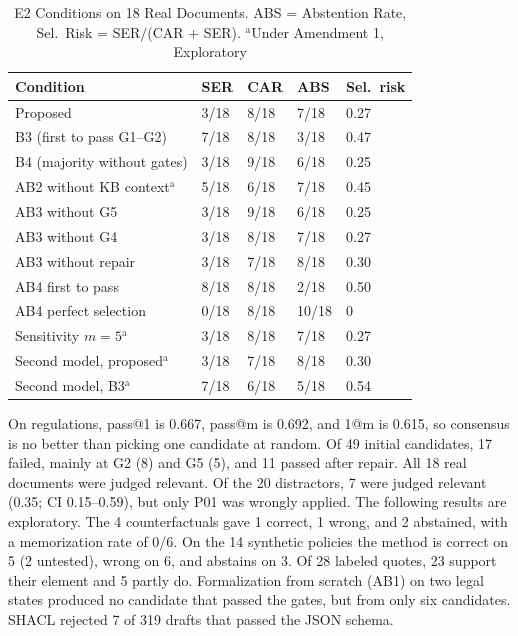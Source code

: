 \documentclass[conference]{IEEEtran}
\begin{document}
\begin{table}[t]
\centering
\caption{E2 Conditions on 18 Real Documents. ABS = Abstention Rate, Sel.\ Risk = SER$/$(CAR $+$ SER). $^{\mathrm{a}}$Under Amendment 1, Exploratory}
\label{tab:e2}
\scriptsize
\setlength{\tabcolsep}{3pt}
\begin{tabularx}{\columnwidth}{@{}L P{0.75cm} P{0.75cm} P{0.75cm} P{1.1cm}@{}}
\toprule
\textbf{Condition} & \textbf{SER} & \textbf{CAR} & \textbf{ABS} & \textbf{Sel.\ risk} \\
\midrule
Proposed & 3/18 & 8/18 & 7/18 & 0.27 \\
B3 (first to pass G1--G2) & 7/18 & 8/18 & 3/18 & 0.47 \\
B4 (majority without gates) & 3/18 & 9/18 & 6/18 & 0.25 \\
AB2 without KB context$^{\mathrm{a}}$ & 5/18 & 6/18 & 7/18 & 0.45 \\
AB3 without G5 & 3/18 & 9/18 & 6/18 & 0.25 \\
AB3 without G4 & 3/18 & 8/18 & 7/18 & 0.27 \\
AB3 without repair & 3/18 & 7/18 & 8/18 & 0.30 \\
AB4 first to pass & 8/18 & 8/18 & 2/18 & 0.50 \\
AB4 perfect selection & 0/18 & 8/18 & 10/18 & 0 \\
Sensitivity $m = 5$$^{\mathrm{a}}$ & 3/18 & 8/18 & 7/18 & 0.27 \\
Second model, proposed$^{\mathrm{a}}$ & 3/18 & 7/18 & 8/18 & 0.30 \\
Second model, B3$^{\mathrm{a}}$ & 7/18 & 6/18 & 5/18 & 0.54 \\
\bottomrule
\end{tabularx}
\end{table}

On regulations, pass@1 is 0.667, pass@m is 0.692, and 1@m is 0.615, so consensus is no better than picking one candidate at random. Of 49 initial candidates, 17 failed, mainly at G2 (8) and G5 (5), and 11 passed after repair. All 18 real documents were judged relevant. Of the 20 distractors, 7 were judged relevant (0.35; CI 0.15--0.59), but only P01 was wrongly applied. The following results are exploratory. The 4 counterfactuals gave 1 correct, 1 wrong, and 2 abstained, with a memorization rate of 0/6. On the 14 synthetic policies the method is correct on 5 (2 untested), wrong on 6, and abstains on 3. Of 28 labeled quotes, 23 support their element and 5 partly do. Formalization from scratch (AB1) on two legal states produced no candidate that passed the gates, but from only six candidates. SHACL rejected 7 of 319 drafts that passed the JSON schema.
\end{document}
